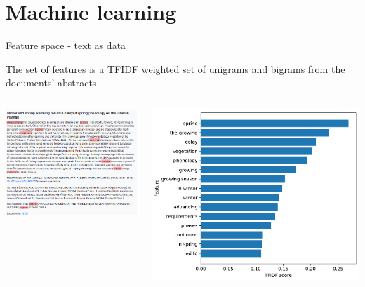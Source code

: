 \documentclass[9pt]{beamer}
\begin{document}
\section{Machine learning}

\begin{frame}
\tableofcontents[currentsection]
\end{frame}

\begin{frame}{Feature space - text as data}

The set of features is a TFIDF weighted set of unigrams and bigrams from the documents' abstracts

\medskip

\begin{columns}
	\begin{column}{0.5\linewidth}
		\includegraphics[width=\linewidth]{images/doc_example.png}
	\end{column}
	\begin{column}{0.5\linewidth}
		\includegraphics[width=\linewidth]{images/example_doc_tfidf.pdf}
	\end{column}
\end{columns}


\end{frame}
\end{document}
